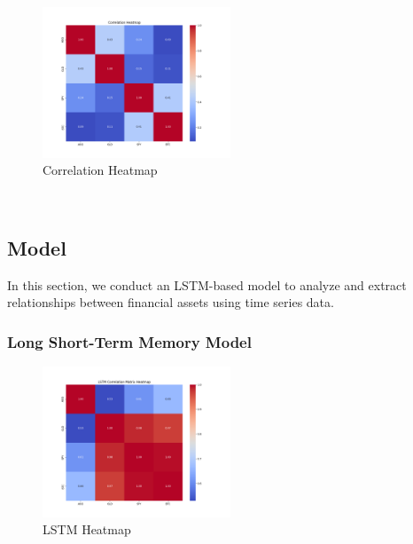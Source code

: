 \documentclass{article}
\begin{document}
\begin{figure}[H]
    \centering
    \includegraphics[width=0.5\textwidth]{figures/correlation_heatmap.png}
    \caption{Correlation Heatmap}
    \label{heat}
    
\end{figure}
\

\subsection{Model}

In this section, we conduct an LSTM-based model to analyze and extract relationships between financial assets using time series data.


\subsubsection{Long Short-Term Memory Model}





\begin{figure}[h!]
    \centering
    \includegraphics[width=0.5\textwidth]{figures/lstm_correlation_heatmap_with_labels.png}
    \caption{LSTM Heatmap}
    \label{lstmh}
    
\end{figure}
\end{document}
